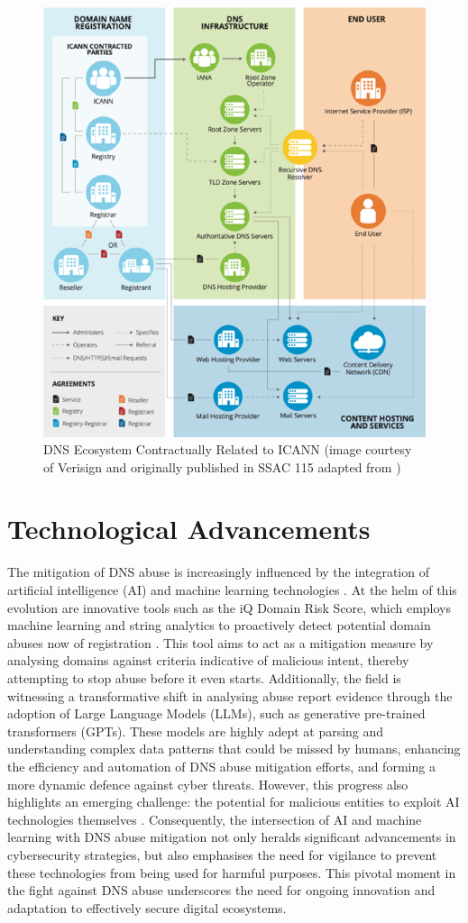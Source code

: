 \captionsetup{font= footnotesize}
\begin{figure}[H]
\centering
    \includegraphics[width=0.6\linewidth]{background/DNSECO.png}
    \caption{DNS Ecosystem Contractually Related to ICANN (image
courtesy of Verisign and originally published in SSAC 115 adapted from \cite{SSAC2023SAC115})}
    \label{fig:fig14}
\end{figure}


\section{Technological Advancements}

The mitigation of DNS abuse is increasingly influenced by the integration of artificial intelligence (AI) and machine learning technologies \cite{goethals2021enabling}. At the helm of this evolution are innovative tools such as the iQ Domain Risk Score, which employs machine learning and string analytics to proactively detect potential domain abuses now of registration \cite{dnsabuseAI2023}. This tool aims to act as a mitigation measure by analysing domains against criteria indicative of malicious intent, thereby attempting to stop abuse before it even starts. Additionally, the field is witnessing a transformative shift in analysing abuse report evidence through the adoption of Large Language Models (LLMs), such as generative pre-trained transformers (GPTs). These models are highly adept at parsing and understanding complex data patterns that could be missed by humans, enhancing the efficiency and automation of DNS abuse mitigation efforts, and forming a more dynamic defence against cyber threats. However, this progress also highlights an emerging challenge: the potential for malicious entities to exploit AI technologies themselves \cite{halvorsenAI2023}.  Consequently, the intersection of AI and machine learning with DNS abuse mitigation not only heralds significant advancements in cybersecurity strategies, but also emphasises the need for vigilance to prevent these technologies from being used for harmful purposes. This pivotal moment in the fight against DNS abuse underscores the need for ongoing innovation and adaptation to effectively secure digital ecosystems.

